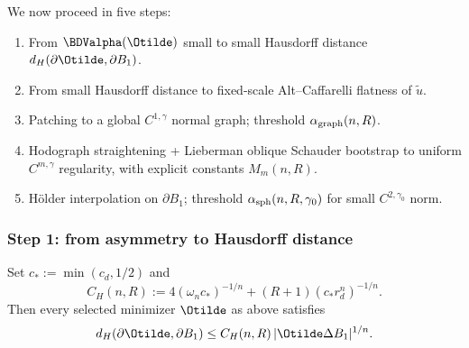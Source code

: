 We now proceed in five steps:
\begin{enumerate}
\item[(S1)] From \(\BDValpha(\Otilde)\) small to small Hausdorff distance
   \(d_H(\partial\Otilde,\partial B_1)\).
\item[(S2)] From small Hausdorff distance to fixed-scale Alt--Caffarelli
   flatness of \(\widetilde u\).
\item[(S3)] Patching to a global \(C^{1,\gamma}\) normal graph; threshold
   \(\alpha_{\rm graph}(n,R)\).
\item[(S4)] Hodograph straightening + Lieberman oblique Schauder bootstrap
   to uniform \(C^{m,\gamma}\) regularity, with explicit constants
   \(M_m(n,R)\).
\item[(S5)] H\"older interpolation on \(\partial B_1\); threshold
   \(\alpha_{\rm sph}(n,R,\gamma_0)\) for small \(C^{2,\gamma_0}\) norm.
\end{enumerate}

\subsubsection{Step 1: from asymmetry to Hausdorff distance}
\label{subsubsec:plan1-ge-S1}

\begin{lemma}
\label{lem:plan1-ge-density-Hausdorff}
Set \(c_*:=\min(c_d,1/2)\) and
\begin{equation}\label{eq:plan1-ge-CH}
   C_H(n,R)
   :=4(\omega_n c_*)^{-1/n}+(R+1)(c_*r_d^n)^{-1/n}.
\end{equation}
Then every selected minimizer \(\Otilde\) as above satisfies
\begin{equation}\label{eq:plan1-ge-dH-bound}
   d_H(\partial\Otilde,\partial B_1)
   \le C_H(n,R)\,|\Otilde\Delta B_1|^{1/n}.
\end{equation}
\end{lemma}

